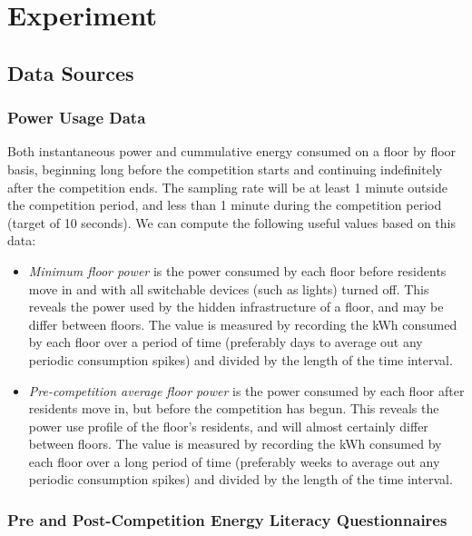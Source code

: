 \chapter{Experiment}


\section{Data Sources}

\subsection{Power Usage Data}

Both instantaneous power and cummulative energy consumed on a floor by floor basis, beginning long before the competition starts and continuing indefinitely after the competition ends. The sampling rate will be at least 1 minute outside the competition period, and less than 1 minute during the competition period (target of 10 seconds). We can compute the following useful values based on this data:

\begin{itemize}

\item \emph{Minimum floor power} is the power consumed by each floor before residents move in and with all switchable devices (such as lights) turned off. This reveals the power used by the hidden infrastructure of a floor, and may be differ between floors. The value is measured by recording the kWh consumed by each floor over a period of time (preferably days to average out any periodic consumption spikes) and divided by the length of the time interval.

\item \emph{Pre-competition average floor power} is the power consumed by each floor after residents move in, but before the competition has begun. This reveals the power use profile of the floor's residents, and will almost certainly differ between floors. The value is measured by recording the kWh consumed by each floor over a long period of time (preferably weeks to average out any periodic consumption spikes) and divided by the length of the time interval.

\end{itemize}

\subsection{Pre and Post-Competition Energy Literacy Questionnaires}
\label{sec:exp-literacy-questionnaire}

